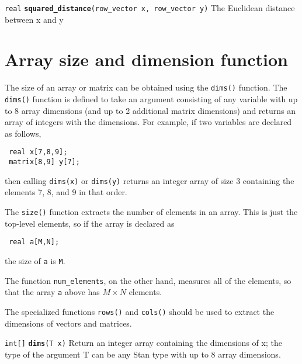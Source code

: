 \documentclass[
  10pt,
]{book}
\begin{document}

\texttt{real} \textbf{\texttt{squared\_distance}}\texttt{(row\_vector\ x,\ row\_vector\ y)}\newline
The Euclidean distance between x and y

\hypertarget{array-size-and-dimension-function}{%
\section{Array size and dimension function}\label{array-size-and-dimension-function}}

The size of an array or matrix can be obtained using the \texttt{dims()}
function. The \texttt{dims()} function is defined to take an argument
consisting of any variable with up to 8 array dimensions (and up to 2
additional matrix dimensions) and returns an array of integers with
the dimensions. For example, if two variables are declared as
follows,

\begin{verbatim}
 real x[7,8,9];
 matrix[8,9] y[7];
\end{verbatim}

then calling \texttt{dims(x)} or \texttt{dims(y)} returns an integer array of size 3
containing the elements 7, 8, and 9 in that order.

The \texttt{size()} function extracts the number of elements in an array.
This is just the top-level elements, so if the array is declared as

\begin{verbatim}
 real a[M,N];
\end{verbatim}

the size of \texttt{a} is \texttt{M}.

The function \texttt{num\_elements}, on the other hand, measures all of the
elements, so that the array \texttt{a} above has \(M \times N\) elements.

The specialized functions \texttt{rows()} and \texttt{cols()} should be used to
extract the dimensions of vectors and matrices.


\texttt{int{[}{]}} \textbf{\texttt{dims}}\texttt{(T\ x)}\newline
Return an integer array containing the dimensions of x; the type of
the argument T can be any Stan type with up to 8 array dimensions.
\end{document}
